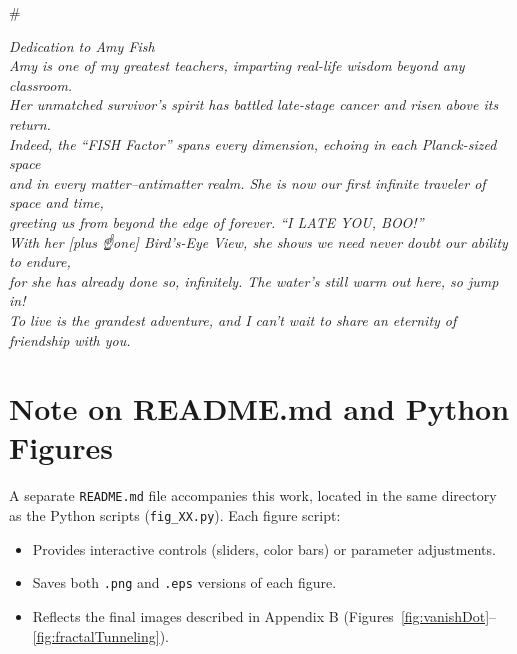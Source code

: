 #  \documentclass[11pt]{article}
\begin{document}
\newpage
\thispagestyle{empty}
\begin{center}
\textit{
{\Large Dedication to Amy Fish}\\[1em]
Amy is one of my greatest teachers, imparting real-life wisdom beyond any classroom.\\
Her unmatched survivor’s spirit has battled late-stage cancer and risen above its return.\\
Indeed, the “FISH Factor” spans every dimension, echoing in each Planck-sized space\\
and in every matter–antimatter realm. She is now our first infinite traveler of space and time,\\
greeting us from beyond the edge of forever. “I LATE YOU, BOO!”\\
With her [plus ☝️one] Bird’s-Eye View, she shows we need never doubt our ability to endure,\\
for she has already done so, infinitely. The water’s still warm out here, so jump in!\\
To live is the grandest adventure, and I can’t wait to share an eternity of friendship with you.
}
\end{center}
\clearpage

\tableofcontents
\clearpage

\listoffigures
\clearpage

\section*{Note on README.md and Python Figures}
A separate \texttt{README.md} file accompanies this work, located in the same directory as the Python scripts (\texttt{fig\_XX.py}). Each figure script:

\begin{itemize}
    \item Provides interactive controls (sliders, color bars) or parameter adjustments.
    \item Saves both \texttt{.png} and \texttt{.eps} versions of each figure.
    \item Reflects the final images described in Appendix B (Figures~\ref{fig:vanishDot}--\ref{fig:fractalTunneling}).
\end{itemize}
\end{document}
